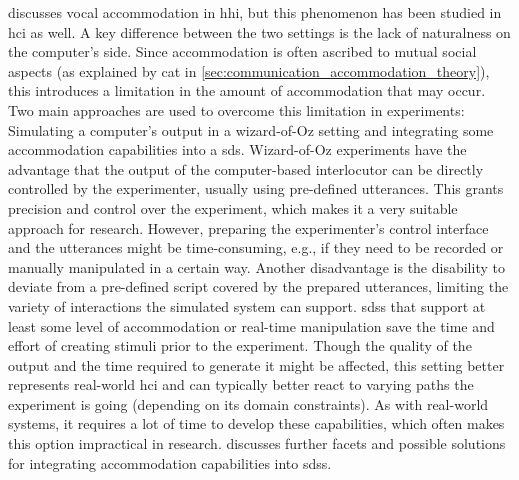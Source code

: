  discusses vocal accommodation in \ac{hhi}, but this phenomenon has been studied in \ac{hci} as well.
A key difference between the two settings is the lack of naturalness on the computer's side.
Since accommodation is often ascribed to mutual social aspects (as explained by \ac{cat} in \cref{sec:communication_accommodation_theory}), this introduces a limitation in the amount of accommodation that may occur.
Two main approaches are used to overcome this limitation in experiments:
Simulating a computer's output in a wizard-of-Oz setting and integrating some accommodation capabilities into a \ac{sds}.
Wizard-of-Oz experiments have the advantage that the output of the computer-based interlocutor can be directly controlled by the experimenter, usually using pre-defined utterances.
This grants precision and control over the experiment, which makes it a very suitable approach for research.
However, preparing the experimenter's control interface and the utterances might be time-consuming, e.g., if they need to be recorded or manually manipulated in a certain way.
Another disadvantage is the disability to deviate from a pre-defined script covered by the prepared utterances, limiting the variety of interactions the simulated system can support.
\Acp{sds} that support at least some level of accommodation or real-time manipulation save the time and effort of creating stimuli prior to the experiment.
Though the quality of the output and the time required to generate it might be affected, this setting better represents real-world \ac{hci} and can typically better react to varying paths the experiment is going (depending on its domain constraints).
As with real-world systems, it requires a lot of time to develop these capabilities, which often makes this option impractical in research.
 discusses further facets and possible solutions for integrating accommodation capabilities into \acp{sds}.

